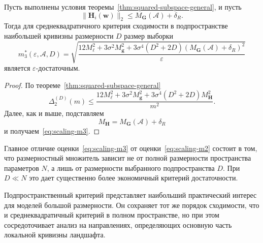 \begin{theorem}
    \label{thm:scaling-sufficient-subspace}
    Пусть выполнены условия теоремы~\ref{thm:squared-subspace-general}, и пусть
    \begin{equation}
        \|\mathbf H_i(\mathbf w)\|_2
        \le
        M_{\mathbf G}(\mathcal A)+\delta_R.
    \end{equation}
    Тогда для среднеквадратичного критерия сходимости в подпространстве наибольшей кривизны размерности $D$ размер выборки
    \begin{equation}
        \label{eq:scaling-m3}
        m_3^*(\varepsilon,\mathcal A,D)
        =
        \sqrt{
            \frac{
                12M_{\ell}^2
                +
                3\sigma^2 M_{\mathbf g}^2
                +
                3\sigma^4(D^2+2D)\left(M_{\mathbf G}(\mathcal A)+\delta_R\right)^2
            }{\varepsilon}
        }
    \end{equation}
    является $\varepsilon$-достаточным.
\end{theorem}

\begin{proof}
    По теореме~\ref{thm:squared-subspace-general}
    \begin{equation}
        \Delta_2^{(D)}(m)
        \le
        \frac{
            12M_{\ell}^2
            +
            3\sigma^2 M_{\mathbf g}^2
            +
            3\sigma^4(D^2+2D)M_{\mathbf H}^2
        }{m^2}.
    \end{equation}
    Далее, как и выше, подставляем
    \begin{equation}
        M_{\mathbf H}=M_{\mathbf G}(\mathcal A)+\delta_R
    \end{equation}
    и получаем~\eqref{eq:scaling-m3}.
\end{proof}

Главное отличие оценки~\eqref{eq:scaling-m3} от оценки~\eqref{eq:scaling-m2} состоит в том, что размерностный множитель зависит не от полной размерности пространства параметров $N$, а лишь от размерности выбранного подпространства $D$. При $D \ll N$ это дает существенно более экономичный критерий достаточности.

\begin{remark}
    Подпространственный критерий представляет наибольший практический интерес для моделей большой размерности. Он сохраняет тот же порядок сходимости, что и среднеквадратичный критерий в полном пространстве, но при этом сосредоточивает анализ на направлениях, определяющих основную часть локальной кривизны ландшафта.
\end{remark}

